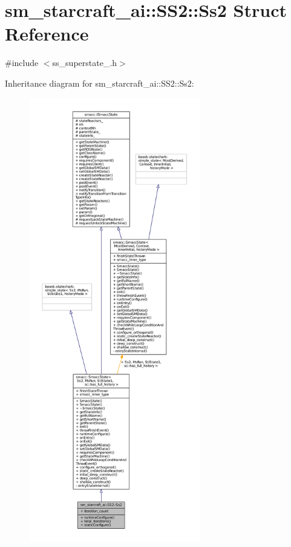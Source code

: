 \hypertarget{structsm__starcraft__ai_1_1SS2_1_1Ss2}{}\section{sm\+\_\+starcraft\+\_\+ai\+:\+:S\+S2\+:\+:Ss2 Struct Reference}
\label{structsm__starcraft__ai_1_1SS2_1_1Ss2}


{\ttfamily \#include $<$ss\+\_\+superstate\+\_.\+h$>$}



Inheritance diagram for sm\+\_\+starcraft\+\_\+ai\+:\+:S\+S2\+:\+:Ss2\+:
\nopagebreak
\begin{figure}[H]
\begin{center}
\leavevmode
\includegraphics[height=550pt]{structsm__starcraft__ai_1_1SS2_1_1Ss2__inherit__graph}
\end{center}
\end{figure}


